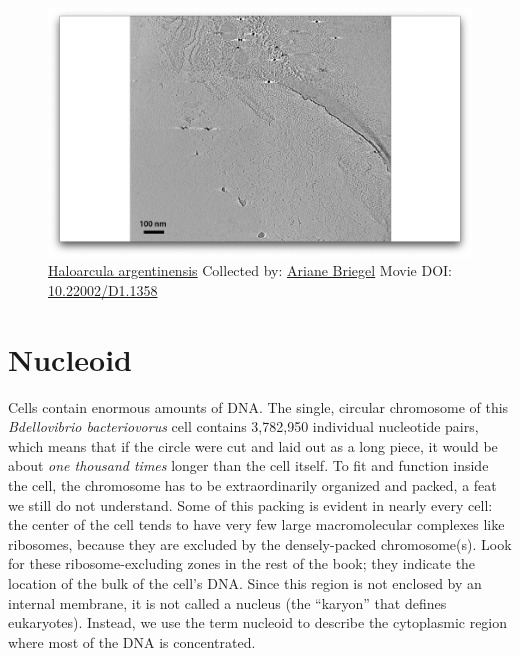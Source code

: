 \documentclass[]{tufte-book}
\begin{document}
\begin{figure}
\includegraphics{movie_stills/2_9} \caption[\protect\hyperlink{tree}{Haloarcula argentinensis} Collected
by: \protect\hyperlink{ariane_briegel}{Ariane Briegel} Movie DOI:
\href{https://doi.org/10.22002/D1.1358}{10.22002/D1.1358}]{\protect\hyperlink{tree}{Haloarcula argentinensis} Collected
by: \protect\hyperlink{ariane_briegel}{Ariane Briegel} Movie DOI:
\href{https://doi.org/10.22002/D1.1358}{10.22002/D1.1358}}\label{fig:2-9}
\end{figure}

\section{Nucleoid}\label{nucleoid}

Cells contain enormous amounts of DNA. The single, circular chromosome
of this \emph{Bdellovibrio bacteriovorus} cell contains 3,782,950
individual nucleotide pairs, which means that if the circle were cut and
laid out as a long piece, it would be about \emph{one thousand times}
longer than the cell itself. To fit and function inside the cell, the
chromosome has to be extraordinarily organized and packed, a feat we
still do not understand. Some of this packing is evident in nearly every
cell: the center of the cell tends to have very few large macromolecular
complexes like ribosomes, because they are excluded by the
densely-packed chromosome(s). Look for these ribosome-excluding zones in
the rest of the book; they indicate the location of the bulk of the
cell's DNA. Since this region is not enclosed by an internal membrane,
it is not called a nucleus (the ``karyon'' that defines eukaryotes).
Instead, we use the term nucleoid to describe the cytoplasmic region
where most of the DNA is concentrated.
\end{document}
